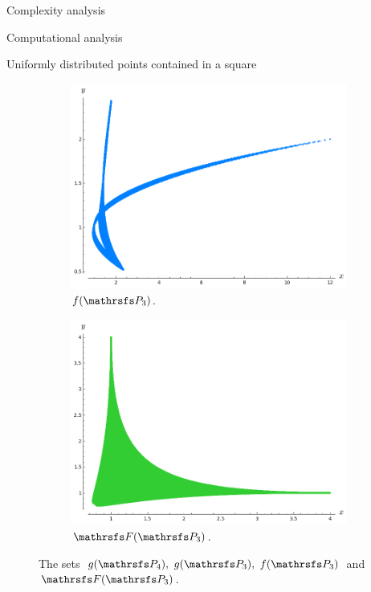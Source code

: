 \documentclass[11pt, a4paper, english, twoside, notitlepage, openright]{report}
\begin{document}
\begin{chapter}{Complexity analysis}
\begin{section}{Computational analysis}
\begin{subsection}{Uniformly distributed points contained in a square}
\begin{figure}[ht!]
\hspace{0.1cm}
\begin{subfigure}{.49\linewidth}\centering
\includegraphics[width=1\textwidth]{plots/ch5_05_P3.png}
\vspace{-0.4cm}\caption{$f(\PP_3)$.\label{fig:fP3}}
\end{subfigure}
\begin{subfigure}{.49\linewidth}\centering
\includegraphics[width=1\textwidth]{plots/ch5_06_P3.png}
\vspace{-0.4cm}\caption{$\FFF(\PP_3)$.\label{fig:FFFP3}}
\end{subfigure}
\vspace{-0.1cm}\caption{The sets $g(\PP_4),\ g(\PP_3),\ f(\PP_3)$ and $\FFF(\PP_3)$.\label{fig:discAll}}
\end{figure}


\end{subsection}
\end{section}
\end{chapter}
\end{document}
